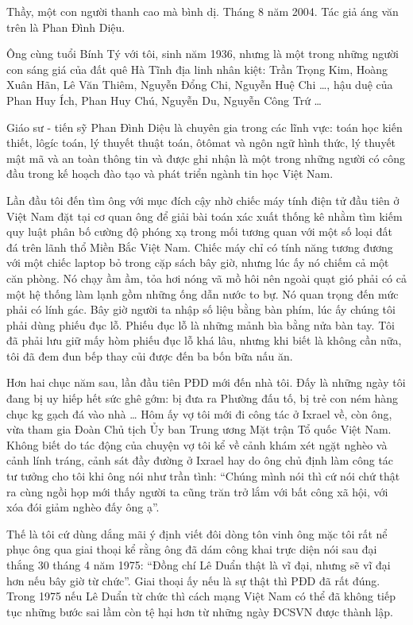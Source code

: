 Thầy, một con người thanh cao mà bình dị.
Tháng 8 năm 2004.
Tác giả áng văn trên là Phan Đình Diệu.

Ông cùng tuổi Bính Tý với tôi, sinh năm 1936, nhưng là một trong những người con sáng giá của đất quê Hà Tĩnh địa linh nhân kiệt: Trần Trọng Kim, Hoàng Xuân Hãn, Lê Văn Thiêm, Nguyễn Đổng Chi, Nguyễn Huệ Chi …, hậu duệ của Phan Huy Ích, Phan Huy Chú, Nguyễn Du, Nguyễn Công Trứ … 

Giáo sư - tiến sỹ Phan Đình Diệu là chuyên gia trong các lĩnh vực: toán học kiến thiết, lôgíc toán, lý thuyết thuật toán, ôtômat và ngôn ngữ hình thức, lý thuyết mật mã và an toàn thông tin và được ghi nhận là một trong những người có công đầu trong kế hoạch đào tạo và phát triển ngành tin học Việt Nam.

Lần đầu tôi đến tìm ông với mục đích cậy nhờ chiếc máy tính điện tử đầu tiên ở Việt Nam đặt tại cơ quan ông để giải bài toán xác xuất thống kê nhằm tìm kiếm quy luật phân bố cường độ phóng xạ trong mối tương quan với một số loại đất đá trên lãnh thổ Miền Bắc Việt Nam. Chiếc máy chỉ có tính năng tương đương với một chiếc laptop bỏ trong cặp sách bây giờ, nhưng lúc ấy nó chiếm cả một căn phòng. Nó chạy ầm ầm, tỏa hơi nóng vã mồ hôi nên ngoài quạt gió phải có cả một hệ thống làm lạnh gồm những ống dẫn nước to bự. Nó quan trọng đến mức phải có lính gác. Bây giờ người ta nhập số liệu bằng bàn phím, lúc ấy chúng tôi phải dùng phiếu đục lỗ. Phiếu đục lỗ là những mảnh bìa bằng nửa bàn tay. Tôi đã phải lưu giữ mấy hòm phiếu đục lỗ khá lâu, nhưng khi biết là không cần nữa, tôi đã đem đun bếp thay củi được đến ba bốn bữa nấu ăn. 

Hơn hai chục năm sau, lần đầu tiên PĐD mới đến nhà tôi. Đấy là những ngày tôi đang bị uy hiếp hết sức ghê gớm: bị đưa ra Phường đấu tố, bị trẻ con ném hàng chục kg gạch đá vào nhà … Hôm ấy vợ tôi mới đi công tác ở Ixrael về, còn ông, vừa tham gia Đoàn Chủ tịch Ủy ban Trung ương Mặt trận Tổ quốc Việt Nam. Không biết do tác động của chuyện vợ tôi kể về cảnh khám xét ngặt nghèo và cảnh lính tráng, cảnh sát đầy đường ở Ixrael hay do ông chủ định làm công tác tư tưởng cho tôi khi ông nói như trần tình: “Chúng mình nói thì cứ nói chứ thật ra cùng ngồi họp mới thấy người ta cũng trăn trở lắm với bất công xã hội, với xóa đói giảm nghèo đấy ông ạ”. 

Thế là tôi cứ dùng dắng mãi ý định viết đôi dòng tôn vinh ông mặc tôi rất nể phục ông qua giai thoại kể rằng ông đã dám công khai trực diện nói sau đại thắng 30 tháng 4 năm 1975: “Đồng chí Lê Duẩn thật là vĩ đại, nhưng sẽ vĩ đại hơn nếu bây giờ từ chức”. Giai thoại ấy nếu là sự thật thì PĐD đã rất đúng. Trong 1975 nếu Lê Duẩn từ chức thì cách mạng Việt Nam có thể đã không tiếp tục những bước sai lầm còn tệ hại hơn từ những ngày ĐCSVN được thành lập. 

